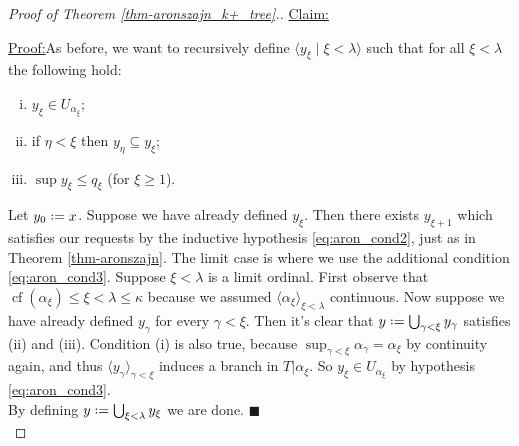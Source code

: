 \documentclass[11pt,a4paper]{report}
\theoremstyle{definition}
\theoremstyle{num.custom-title}
\theoremstyle{custom-title}
\newenvironment{claim}[1]{\par\noindent\underline{Claim#1:}\space}{} %
\newenvironment{claimproof}[1]{\par\noindent\underline{Proof:}\space#1}{\leavevmode\unskip\penalty9999 \hbox{}\nobreak\hfill\quad\hbox{$\blacksquare$}} %
\DeclareMathOperator{\sse}{\subseteq}
\DeclareMathOperator{\height}{height}
\DeclareMathOperator{\length}{length}
\DeclareMathOperator{\cf}{cf}
\newcommand*{\defeq}{\mathrel{\rlap{%
                     \raisebox{0.3ex}{$\cdot$}}%
                     \raisebox{-0.3ex}{$\cdot$}}%
                     =}
\begin{document}
\begin{proof}[Proof of Theorem \ref{thm-aronszajn_k+_tree}.]
\begin{claim}{}
\begin{claimproof}
As before, we want to recursively define $\langle y_\xi \mid \xi < \lambda \rangle$ such that for all $\xi < \lambda$ the following hold:
\begin{enumerate}[(i)]
\item $y_\xi \in U_{\alpha_\xi}$;
\item if $\eta < \xi$ then $y_\eta \sse y_\xi$;
\item $\sup y_\xi \leq q_\xi$ (for $\xi \geq 1$).
\end{enumerate}
Let $y_0 \defeq x$. Suppose we have already defined $y_\xi$. Then there exists $y_{\xi+1}$ which satisfies our requests by the inductive hypothesis \eqref{eq:aron_cond2}, just as in Theorem \ref{thm-aronszajn}. The limit case is where we use the additional condition \eqref{eq:aron_cond3}. Suppose $\xi < \lambda$ is a limit ordinal. First observe that $\cf(\alpha_\xi) \leq \xi < \lambda \leq \kappa$ because we assumed $\langle \alpha_\xi \rangle_{\xi < \lambda}$ continuous. Now suppose we have already defined $y_\gamma$ for every $\gamma < \xi$. Then it's clear that $y \defeq \bigcup_{\gamma < \xi} y_\gamma$ satisfies (ii) and (iii). Condition (i) is also true, 
because $\sup_{\gamma < \xi} \alpha_\gamma = \alpha_\xi$ by continuity again, and thus $\langle y_\gamma \rangle_{\gamma < \xi}$ induces a branch in $T|\alpha_\xi$. So $y_\xi \in U_{\alpha_\xi}$ by hypothesis \eqref{eq:aron_cond3}.\\[6pt]
By defining $y \defeq \bigcup_{\xi < \lambda} y_\xi$ we are done.
\end{claimproof}
\end{claim}\\


\end{proof}
\end{document}
